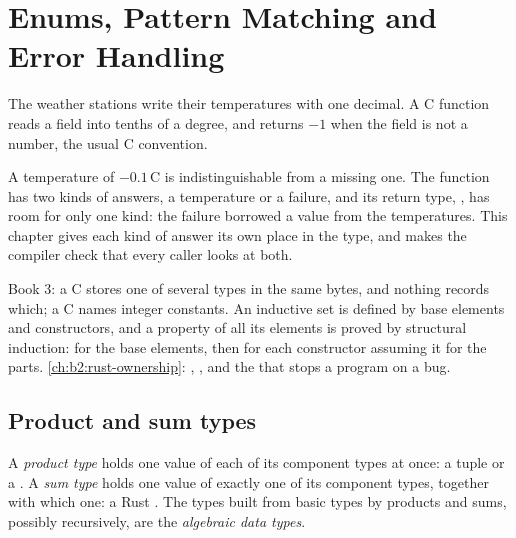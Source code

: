 \chapter{Enums, Pattern Matching and Error Handling}\label{ch:b2:rust-enums-and-errors}

The weather stations write their temperatures with one decimal. A C function reads a field into tenths of a degree,
and returns $-1$ when the field is not a number, the usual C convention.

\label{lst:b2:rust-enums-and-errors:temp-code}

\label{out:b2:rust-enums-and-errors:temp-code}

A temperature of $-0.1$\,\textdegree C is indistinguishable from a missing one. The function has two kinds of
answers, a temperature or a failure, and its return type, , has room for only one kind: the failure
borrowed a value from the temperatures. This chapter gives each kind of answer its own place in the type, and makes
the compiler check that every caller looks at both.

\begin{recall}
Book 3: a C  stores one of several types in the same bytes, and nothing records which; a C 
names integer constants. An inductive set is defined by base elements and constructors, and a property of all its
elements is proved by structural induction: for the base elements, then for each constructor assuming it for the
parts. \cref{ch:b2:rust-ownership}: , , and the  that stops a program on a bug.
\end{recall}

\section{Product and sum types}\label{sec:b2:rust-enums-and-errors:types}

\begin{definition}\label{def:b2:rust-enums-and-errors:adt}
A \emph{product type} holds one value of each of its component types at once: a tuple
 or a . A \emph{sum type} holds one value of exactly one of its component
types, together with which one: a Rust . The types built from basic types by products and sums, possibly
recursively, are the \emph{algebraic data types}.
\end{definition}

